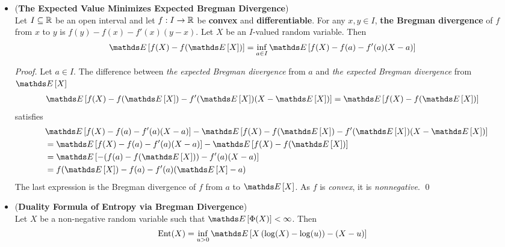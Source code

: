 \documentclass[11pt]{article}
\begin{document}
\begin{itemize}
\item \begin{theorem} (\textbf{The Expected Value Minimizes Expected Bregman Divergence}) \citep{boucheron2013concentration} \\
Let $I \subseteq {\mathbb R}$ be an open interval and let $f: I \to {\mathbb R}$ be \textbf{convex} and \textbf{differentiable}. For any $x,y \in I$, \textbf{the Bregman divergence} of $f$ from $x$ to $y$ is $f(y) - f(x) - f'(x)(y-x)$. Let $X$ be an $I$-valued random variable. Then
\begin{align}
\E{}{f(X) - f(\E{}{X}) } &= \inf_{a \in I}\E{}{f(X) - f(a) - f'(a)(X-a)}\label{eqn: bregmann_inf}
\end{align}
\end{theorem}
\begin{proof}
Let $a \in I$. The difference between \emph{the expected Bregman divergence} from $a$ and \emph{the expected Bregman divergence} from $\E{}{X}$
\begin{align*}
\E{}{f(X) - f(\E{}{X}) - f'(\E{}{X})(X - \E{}{X})} 
&= \E{}{f(X) - f(\E{}{X}) }
\end{align*} satisfies
\begin{align*}
&\E{}{f(X) - f(a) - f'(a)(X-a)} - \E{}{f(X) - f(\E{}{X}) - f'(\E{}{X})(X - \E{}{X})} \\
&= \E{}{f(X) - f(a) - f'(a)(X-a)} - \E{}{f(X) - f(\E{}{X}) } \\
&= \E{}{-(f(a) - f(\E{}{X})) - f'(a)(X-a)} \\
&= f(\E{}{X}) - f(a) - f'(a)(\E{}{X} - a) 
\end{align*} The last expression is the Bregman divergence of $f$ from $a$ to $\E{}{X}$. As $f$ is \emph{convex}, it is \emph{nonnegative}. \qed 
\end{proof}

\item \begin{corollary} (\textbf{Duality Formula of Entropy via Bregman Divergence}) \citep{boucheron2013concentration}\\
Let $X$ be a non-negative random variable such that $\E{}{\Phi(X)} < \infty$. Then 
\begin{align}
\text{Ent}(X) &= \inf_{u > 0}\E{}{X\paren{\log(X) - \log(u)} - (X - u) } \label{eqn: duality_entropy_3_breg}
\end{align}
\end{corollary}


\end{itemize}
\end{document}
